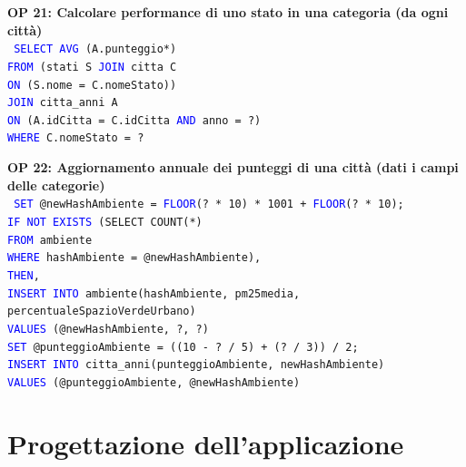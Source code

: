 \documentclass[a4paper,12pt]{report}
\begin{document}
            \noindent
            \textbf{OP 21: Calcolare performance di uno stato in una categoria (da ogni città)} \\
            \texttt{
                \textcolor{blue}{SELECT AVG} (A.punteggio*) \\
                \textcolor{blue}{FROM} (stati S \textcolor{blue}{JOIN} citta C \\
                \textcolor{blue}{ON} (S.nome = C.nomeStato)) \\
                \textcolor{blue}{JOIN} citta\_anni A \\
                \textcolor{blue}{ON} (A.idCitta = C.idCitta \textcolor{blue}{AND} anno = ?) \\
                \textcolor{blue}{WHERE} C.nomeStato = ? \\
            }

            \noindent
            \textbf{OP 22: Aggiornamento annuale dei punteggi di una città (dati i campi delle categorie)} \\
            \texttt{
                \textcolor{blue}{SET} @newHashAmbiente = \textcolor{blue}{FLOOR}(? * 10) * 1001 + \textcolor{blue}{FLOOR}(? * 10); \\
                \textcolor{blue}{IF NOT EXISTS} (SELECT COUNT(*) \\
                \textcolor{blue}{FROM} ambiente \\
                \textcolor{blue}{WHERE} hashAmbiente = @newHashAmbiente),  \\
                \textcolor{blue}{THEN},  \\
                \textcolor{blue}{INSERT INTO} ambiente(hashAmbiente, pm25media, percentualeSpazioVerdeUrbano) \\
                \textcolor{blue}{VALUES} (@newHashAmbiente, ?, ?) \\
                \textcolor{blue}{SET} @punteggioAmbiente = ((10 - ? / 5) + (? / 3)) / 2; \\
                \textcolor{blue}{INSERT INTO} citta\_anni(punteggioAmbiente, newHashAmbiente) \\
                \textcolor{blue}{VALUES} (@punteggioAmbiente, @newHashAmbiente) \\
            }

        \chapter{Progettazione dell'applicazione}
            
\end{document}
